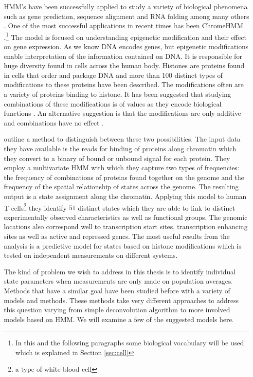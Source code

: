 HMM's have been successfully applied to study a variety of biological phenomena such as gene prediction, sequence alignment and RNA folding among many others \citep[and references therein]{Yoon:2009dl}. One of the most successful applications in recent times has been ChromeHMM \citep{Ernst:2012iia}.\footnote{In this and the following paragraphs some biological vocabulary will be used which is explained in Section \ref{sec:cell}} The model is focused on understanding epigenetic modification and their effect on gene expression. As we know DNA encodes genes, but epigenetic modifications enable interpretation of the information contained on DNA. It is responsible for huge diversity found in cells across the human body. Histones are proteins found in cells that order and package DNA and more than 100 distinct types of modifications to these proteins have been described. The modifications often are a variety of proteins binding to histone. It has been suggested that studying combinations of these modifications is of values as they encode biological functions \citep{strahl2000language}. An alternative suggestion is that the modifications are only additive and combinations have no effect \cite{schreiber2002signaling}.

\cite{Ernst:2010bh} outline a method to distinguish between these two possibilities. The input data they have available is the reads for binding of proteins along chromatin which they convert to a binary of bound or unbound signal for each protein.  They employ a multivariate HMM with which they capture two types of frequencies: the frequency of combinations of proteins found together on the genome and the frequency of the spatial relationship of states across the genome. The resulting output is a state assignment along the chromatin. Applying this model to human T cells\footnote{a type of white blood cell} they identify $51$ distinct states which they are able to link to distinct experimentally observed characteristics as well as functional groups. The genomic locations also correspond well to transcription start sites, transcription enhancing sites as well as active and repressed genes.  The most useful results from the analysis is a predictive model for states based on histone modifications which is tested on independent measurements on different systems.


The kind of problem we wish to address in this thesis is to identify individual state parameters when measurements are only made on population averages. Methods that have a similar goal have been studied before with a variety of models and methods. These methods take very different approaches to address this question varying from simple deconvolution algorithm to more involved models based on HMM. We will examine a few of the suggested models here.


